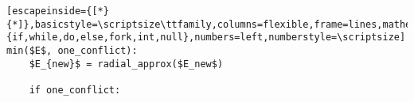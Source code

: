 \renewcommand{\ttdefault}{pcr}
\begin{lstlisting}[escapeinside={[*}{*]},basicstyle=\scriptsize\ttfamily,columns=flexible,frame=lines,mathescape=true,xleftmargin=5.0ex,keywordstyle=\textbf,morekeywords={if,while,do,else,fork,int,null},numbers=left,numberstyle=\scriptsize]
min($E$, one_conflict):
	$E_{new}$ = radial_approx($E_new$)
	
	if one_conflict:
		
\end{lstlisting}
